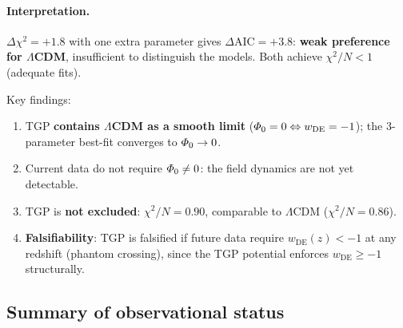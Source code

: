 \paragraph{Interpretation.}
$\Delta\chi^{2}=+1.8$ with one extra parameter gives
$\Delta\mathrm{AIC}=+3.8$: \textbf{weak preference for
$\Lambda$CDM}, insufficient to distinguish the models.
Both achieve $\chi^{2}/N<1$ (adequate fits).

Key findings:
\begin{enumerate}[nosep]
  \item TGP \textbf{contains $\Lambda$CDM as a smooth limit}
        ($\varPhi_0=0 \Leftrightarrow w_{\mathrm{DE}}=-1$);
        the 3-parameter best-fit converges to $\varPhi_0\to 0$.
  \item Current data do not require $\varPhi_0\neq 0$: the field
        dynamics are not yet detectable.
  \item TGP is \textbf{not excluded}: $\chi^{2}/N=0.90$,
        comparable to $\Lambda$CDM ($\chi^{2}/N=0.86$).
  \item \textbf{Falsifiability}: TGP is falsified if future data
        require $w_{\mathrm{DE}}(z)<-1$ at any redshift (phantom
        crossing), since the TGP potential enforces $w_{\mathrm{DE}}\geq -1$
        structurally.
\end{enumerate}

\subsection{Summary of observational status}\label{ssec:test-summary}

